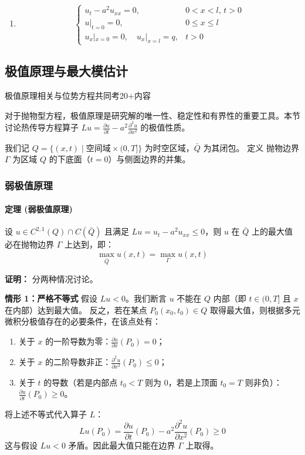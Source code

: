 \documentclass[12pt,a4paper]{ctexart}
\begin{document}
\begin{enumerate}
\begin{enumerate}
			\item 
			\begin{equation}
				\begin{cases}
					u_t - a^2 u_{xx} = 0, & 0 < x < l, \, t > 0 \\
					u|_{t=0} = 0, & 0 \leqslant x \leqslant l \\
					u_x|_{x=0} = 0, \quad u_x|_{x=l} = q, & t > 0
				\end{cases}
			\end{equation}
		\end{enumerate}
	\end{enumerate}
	
	\subsection{极值原理与最大模估计}
	
	极值原理相关与位势方程共同考20+内容
	
	对于抛物型方程，极值原理是研究解的唯一性、稳定性和有界性的重要工具。本节讨论热传导方程算子 $L u = \frac{\partial u}{\partial t} - a^2 \frac{\partial^2 u}{\partial x^2}$ 的极值性质。
	
	我们记 $Q = \{(x,t) \mid \text{空间域} \times (0, T]\}$ 为时空区域，$\bar{Q}$ 为其闭包。
	定义 抛物边界 $\Gamma$ 为区域 $Q$ 的下底面（$t=0$）与侧面边界的并集。
	
	\subsubsection{弱极值原理}
	
	\paragraph{定理  (弱极值原理)}
	设 $u \in C^{2,1}(Q) \cap C(\bar{Q})$ 且满足 $Lu = u_t - a^2 u_{xx} \leqslant 0$，则 $u$ 在 $\bar{Q}$ 上的最大值必在抛物边界 $\Gamma$ 上达到，即：
	\begin{equation}
		\max_{\bar{Q}} u(x,t) = \max_{\Gamma} u(x,t)
	\end{equation}
	
	\textbf{证明：}
	分两种情况讨论。
	
	\textbf{情形 1：严格不等式}
	假设 $Lu < 0$。我们断言 $u$ 不能在 $Q$ 内部（即 $t \in (0, T]$ 且 $x$ 在内部）达到最大值。
	反之，若在某点 $P_0(x_0, t_0) \in Q$ 取得最大值，则根据多元微积分极值存在的必要条件，在该点处有：
	\begin{enumerate}
		\item 关于 $x$ 的一阶导数为零：$\frac{\partial u}{\partial x}(P_0) = 0$；
		\item 关于 $x$ 的二阶导数非正：$\frac{\partial^2 u}{\partial x^2}(P_0) \leqslant 0$；
		\item 关于 $t$ 的导数（若是内部点 $t_0 < T$ 则为 0，若是上顶面 $t_0 = T$ 则非负）：$\frac{\partial u}{\partial t}(P_0) \geqslant 0$。
	\end{enumerate}
	将上述不等式代入算子 $L$：
	\[
	Lu(P_0) = \frac{\partial u}{\partial t}(P_0) - a^2 \frac{\partial^2 u}{\partial x^2}(P_0) \geqslant 0
	\]
	这与假设 $Lu < 0$ 矛盾。因此最大值只能在边界 $\Gamma$ 上取得。
	
\end{document}
